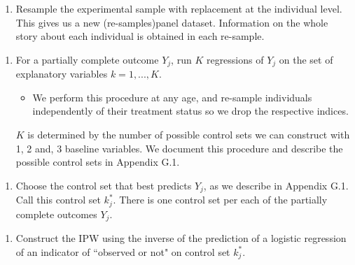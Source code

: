 \documentclass[static]{JJH-Beamer}
\begin{document}
\clearpage
\begin{frame}
 \addtocounter{framenumber}{-1}

\begin{enumerate}[1.]
\item Resample the experimental sample with replacement at the individual level. This gives us a new (re-samples)panel dataset. Information on the whole story about each individual is obtained in each re-sample.
\end{enumerate}

\end{frame}

\begin{frame}
 \addtocounter{framenumber}{-1}

\begin{enumerate}[2.]
\item For a partially complete outcome $Y_{j}$, run $K$ regressions of $Y_{j}$ on the set of explanatory variables $k = 1,..., K$.
\begin{itemize}
\item We perform this procedure at any age, and re-sample individuals independently of their treatment status so we drop the respective indices.
\end{itemize}
$K$ is determined by the number of possible control sets we can construct with 1, 2 and, 3 baseline variables. We document this procedure and describe the possible control sets in Appendix G.1.
\end{enumerate}

\end{frame}

\begin{frame}
 \addtocounter{framenumber}{-1}

\begin{enumerate}[3.]
\item Choose the control set that best predicts $Y_{j}$, as we describe in Appendix G.1. Call this control set $k^*_{j}$. There is one control set per each of the partially complete outcomes $Y_{j}$.
\end{enumerate}

\end{frame}

\begin{frame}
 \addtocounter{framenumber}{-1}

\begin{enumerate}[4.]
\item Construct the IPW using the inverse of the prediction of  a logistic regression of an indicator of ``observed or not" on control set $k^*_{j}$.
\end{enumerate}

\end{frame}
\end{document}
